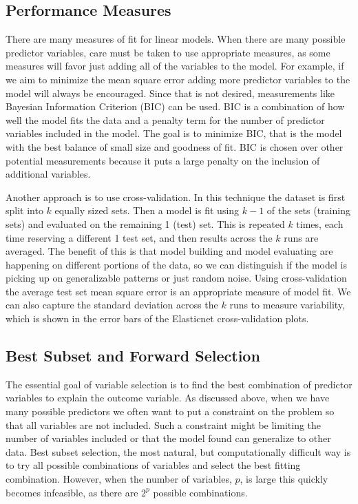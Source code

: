 \documentclass{article}
\begin{document}

\subsection{Performance Measures}

There are many measures of fit for linear models. When there are many possible predictor variables, care must be taken 
to use appropriate measures, as some measures will favor just adding all of the variables to the model. For example, if we 
aim to minimize the mean square error adding more predictor variables to the model will always be encouraged. Since that is 
not desired, measurements like Bayesian Information Criterion (BIC) can be used. BIC is a combination of how well the model 
fits the data and a penalty term for the number of predictor variables included in the model. The goal is to minimize BIC, that is 
the model with the best balance of small size and goodness of fit. BIC is chosen over other potential measurements because it 
puts a large penalty on the inclusion of additional variables.

Another approach is to use cross-validation. In this technique the dataset is first split into $k$ equally sized sets. Then a 
model is fit using $k - 1$ of the sets (training sets) and evaluated on the remaining 1 (test) set. This is repeated $k$ times, 
each time reserving a different 1 test set, and then results across the $k$ runs are averaged. The benefit of this is that model 
building and model evaluating are happening on different portions of the data, so we can distinguish if the model is picking up 
on generalizable patterns or just random noise. Using cross-validation the average test set mean square error is an 
appropriate measure of model fit. We can also capture the standard deviation across the $k$ runs to measure variability, which is shown in the error bars of the Elasticnet cross-validation plots.

\subsection{Best Subset and Forward Selection}

The essential goal of variable selection is to find the best combination of predictor variables to explain the outcome variable. As 
discussed above, when we have many possible predictors we often want to put a constraint on the problem so that all variables 
are not included. Such a constraint might be limiting the number of variables included or that the model found can generalize to 
other data. Best subset selection, the most natural, but computationally difficult way is to try all possible combinations of 
variables and select the best fitting combination. However, when the number of variables, $p$, is large this quickly becomes 
infeasible, as there are $2^p$ possible combinations. 
\end{document}
